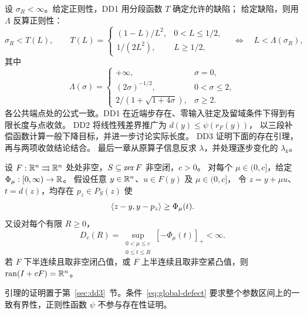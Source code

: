 设 $\sigma_R<\infty$。给定正则性，DD1 用分段函数 $T$ 确定允许的缺陷；
给定缺陷，则用 $\Lambda$ 反算正则性：
\begin{equation}\label{eq:intro-threshold}
 \sigma_R<T(L),\qquad
 T(L)=
 \begin{cases}
 (1-L)/L^2,&0<L\le1/2,\\
 1/(2L^2),&L\ge1/2,
 \end{cases}
 \quad\Longleftrightarrow\quad L<\Lambda(\sigma_R),
\end{equation}
其中
\begin{equation}\label{eq:intro-inverse}
 \Lambda(\sigma)=
 \begin{cases}
 +\infty,&\sigma=0,\\
 (2\sigma)^{-1/2},&0<\sigma\le2,\\
 2/(1+\sqrt{1+4\sigma}),&\sigma\ge2.
 \end{cases}
\end{equation}
各公共端点处的公式一致。DD1 在近端步存在、零输入驻定及留域条件下得到有限长度与点收敛。
DD2 将线性残差界推广为 $d(y)\le\psi(r_F(y))$，
以三段补偿函数计算一般下降目标，并进一步讨论实际长度。
DD3 证明下面的存在引理，再与两项收敛结论结合。
最后一章从原算子信息反求 $\lambda$，并处理逐步变化的 $\lambda_k$。

\begin{lemma}[近端存在引理]\label{lem:existence}
设 $F:\mathbb R^n\rightrightarrows\mathbb R^n$ 处处非空，$S\subseteq\operatorname{zer} F$ 非空闭，$c>0$。
对每个 $\mu\in(0,c]$，给定 $\Phi_\mu:[0,\infty)\to\mathbb R$。
假设任意 $y\in\mathbb R^n$、$u\in F(y)$ 及 $\mu\in(0,c]$，
令 $z=y+\mu u$、$t=d(z)$，均存在 $p_z\in P_S(z)$ 使
\begin{equation}\label{eq:global-anchor}
 \langle z-y,y-p_z\rangle\ge\Phi_\mu(t).
\end{equation}
又设对每个有限 $R\ge0$，
\begin{equation}\label{eq:global-defect}
 D_c(R)=\sup_{\substack{0<\mu\le c\\0\le t\le R}}[-\Phi_\mu(t)]_+<\infty.
\end{equation}
若 $F$ 下半连续且取非空闭凸值，或 $F$ 上半连续且取非空紧凸值，则
$\operatorname{ran}(I+cF)=\mathbb R^n$。
\end{lemma}
引理的证明置于第~\ref{sec:dd3}~节。条件~\eqref{eq:global-defect}
要求整个参数区间上的一致有界性，正则性函数 $\psi$ 不参与存在性证明。
